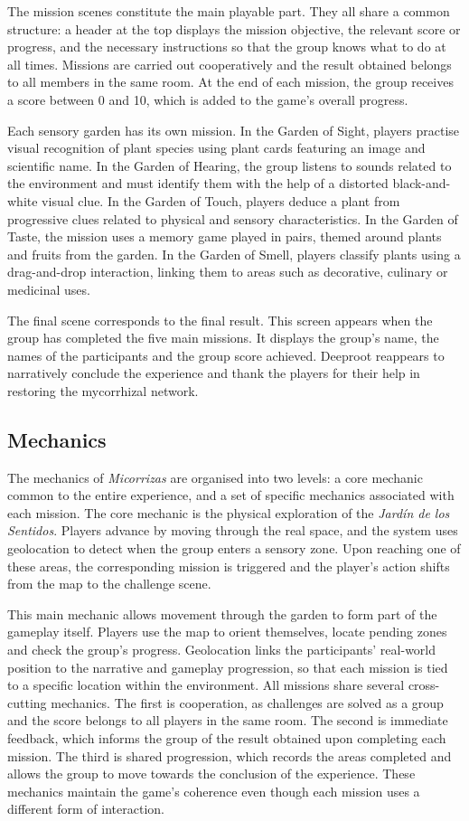 The mission scenes constitute the main playable part. They all share a common structure: a header at the top displays the mission objective, the relevant score or progress, and the necessary instructions so that the group knows what to do at all times. Missions are carried out cooperatively and the result obtained belongs to all members in the same room. At the end of each mission, the group receives a score between 0 and 10, which is added to the game’s overall progress.

Each sensory garden has its own mission. In the Garden of Sight, players practise visual recognition of plant species using plant cards featuring an image and scientific name. In the Garden of Hearing, the group listens to sounds related to the environment and must identify them with the help of a distorted black-and-white visual clue. In the Garden of Touch, players deduce a plant from progressive clues related to physical and sensory characteristics. In the Garden of Taste, the mission uses a memory game played in pairs, themed around plants and fruits from the garden. In the Garden of Smell, players classify plants using a drag-and-drop interaction, linking them to areas such as decorative, culinary or medicinal uses.

The final scene corresponds to the final result. This screen appears when the group has completed the five main missions. It displays the group’s name, the names of the participants and the group score achieved. Deeproot reappears to narratively conclude the experience and thank the players for their help in restoring the mycorrhizal network.


\subsection{Mechanics}
\label{sec:mechanics}
The mechanics of \textit{Micorrizas} are organised into two levels: a core mechanic common to the entire experience, and a set of specific mechanics associated with each mission. The core mechanic is the physical exploration of the \textit{Jardín de los Sentidos}. Players advance by moving through the real space, and the system uses geolocation to detect when the group enters a sensory zone. Upon reaching one of these areas, the corresponding mission is triggered and the player’s action shifts from the map to the challenge scene.

This main mechanic allows movement through the garden to form part of the gameplay itself. Players use the map to orient themselves, locate pending zones and check the group’s progress. Geolocation links the participants’ real-world position to the narrative and gameplay progression, so that each mission is tied to a specific location within the environment.
All missions share several cross-cutting mechanics. The first is cooperation, as challenges are solved as a group and the score belongs to all players in the same room. The second is immediate feedback, which informs the group of the result obtained upon completing each mission. The third is shared progression, which records the areas completed and allows the group to move towards the conclusion of the experience. These mechanics maintain the game’s coherence even though each mission uses a different form of interaction.

